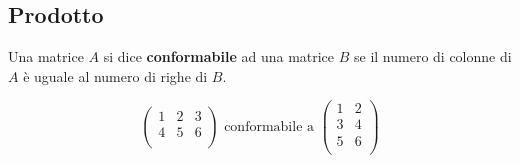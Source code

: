 \subsection{Prodotto}

\begin{definition}
  Una matrice $A$ si dice \textbf{conformabile} ad una matrice $B$ se il numero di colonne di $A$ è uguale al numero di righe di $B$.
\end{definition}
\begin{example}
  $$
    \begin{pmatrix}
      1 & 2 & 3 \\
      4 & 5 & 6 \\
    \end{pmatrix}
    \text{ conformabile a }
    \begin{pmatrix}
      1 & 2 \\
      3 & 4 \\
      5 & 6 \\
    \end{pmatrix}
  $$
\end{example}

